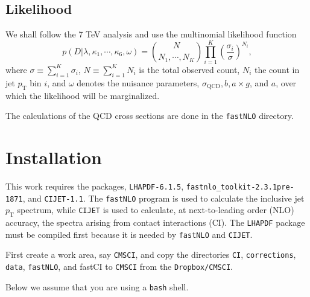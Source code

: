 \documentclass[aps,prd,preprint,nofootinbib]{revtex4}
\begin{document}
\subsection{Likelihood}

We shall follow the 7 TeV analysis and use the  multinomial likelihood function
\begin{equation}
p(D|\lambda, \kappa_1,\cdots,\kappa_6, \omega) = \binom{N}{N_1,\cdots,N_K} \prod_{i=1}^K \left(\frac{\sigma_i}{\sigma}\right)^{N_i},
\label{eq:like}
\end{equation}
where $\sigma \equiv \sum_{i=1}^K \sigma_i$,
$N \equiv \sum_{i=1}^K N_i$ is the total observed count, $N_i$ the count in jet $p_\text{T}$ bin $i$, and $\omega$ denotes the nuisance
parameters,  $\sigma_\text{QCD}, b, a\times g$, and $a$, over which the likelihood will be marginalized.

\bigskip
\bigskip
\bigskip

The calculations of the QCD cross sections are done in the {\tt fastNLO} directory.

\appendix

\section{Installation}
This work requires the packages, {\tt LHAPDF-6.1.5}, {\tt fastnlo\_toolkit-2.3.1pre-1871}, and
{\tt CIJET-1.1}. 
The {\tt fastNLO} program is used to calculate the inclusive jet 
$p_\textrm{T}$ spectrum, while {\tt CIJET} is used to calculate, at next-to-leading order (NLO) accuracy,  the spectra arising from contact
interactions (CI).
The {\tt LHAPDF} package must be compiled first because it is needed by {\tt fastNLO}
and {\tt CIJET}. 

First create a work area, say {\tt CMSCI}, and copy the directories {\tt CI}, {\tt corrections}, {\tt data},
{\tt fastNLO}, and {fastCI} to {\tt CMSCI} from the {\tt Dropbox/CMSCI}. 

\newpage
Below we assume that you are using a {\tt bash} shell.
\end{document}
